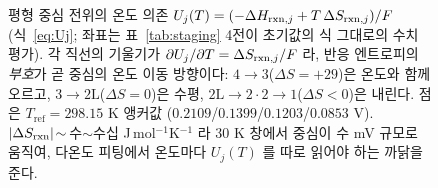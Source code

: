 \begin{figure}[t]
\begin{tikzpicture}[x=0.10cm,y=40cm,>=Latex,font=\scriptsize]
\end{tikzpicture}
\caption{평형 중심 전위의 온도 의존 $U_j(T)=(-\Delta H_{\mathrm{rxn},j}+T\,\Delta S_{\mathrm{rxn},j})/F$(식~\eqref{eq:Uj};
좌표는 표~\ref{tab:staging} 4전이 초기값의 식 그대로의 수치 평가). 각 직선의 기울기가
$\partial U_j/\partial T=\Delta S_{\mathrm{rxn},j}/F$ 라, 반응 엔트로피의 \emph{부호}가 곧 중심의 온도 이동 방향이다:
$4\!\to\!3$($\Delta S{=}{+}29$)은 온도와 함께 오르고, $3\!\to\!2\mathrm L$($\Delta S{=}0$)은 수평,
$2\mathrm L\!\to\!2\cdot2\!\to\!1$($\Delta S{<}0$)은 내린다. 점은 $T_\mathrm{ref}{=}298.15$ K 앵커값
($0.2109$/$0.1399$/$0.1203$/$0.0853$ V). $|\Delta S_{\mathrm{rxn}}|\!\sim\!$ 수$\sim$수십 J\,mol$^{-1}$K$^{-1}$ 라
$30$ K 창에서 중심이 수 mV 규모로 움직여, 다온도 피팅에서 온도마다 $U_j(T)$ 를 따로 읽어야 하는 까닭을 준다.}
\label{fig:cand-fo2-2}
\end{figure}

